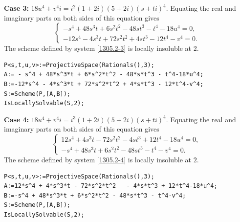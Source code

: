 \documentclass[a4paper,12pt,english,reqno]{amsart}
\begin{document}
{\bf Case 3:} $18u^4+v^4i=i^2(1+2i)(5+2i)(s+ti)^4$. Equating the real and imaginary parts on both sides of this equation gives
\begin{equation}\label{1305.2-3}
\begin{cases}
-s^4 + 48s^3t + 6s^2t^2 - 48st^3 - t^4 - 18u^4=0,\\
-12s^4 - 4s^3t + 72s^2t^2 + 4st^3 - 12t^4 - v^4=0.
\end{cases}
\end{equation}
The scheme defined by system \eqref{1305.2-3} is locally insoluble at $2$.

\begin{lstlisting}
P<s,t,u,v>:=ProjectiveSpace(Rationals(),3);
A:= - s^4 + 48*s^3*t + 6*s^2*t^2 - 48*s*t^3 - t^4-18*u^4;
B:=-12*s^4 - 4*s^3*t + 72*s^2*t^2 + 4*s*t^3 - 12*t^4-v^4;
S:=Scheme(P,[A,B]);
IsLocallySolvable(S,2);
\end{lstlisting}

{\bf Case 4:} $18u^4+v^4i=i^3(1+2i)(5+2i)(s+ti)^4$. Equating the real and imaginary parts on both sides of this equation gives
\begin{equation}\label{1305.2-4}
\begin{cases}
12s^4 + 4s^3t - 72s^2t^2 - 4st^3 + 12t^4 - 18u^4=0,\\
-s^4 + 48s^3t + 6s^2t^2 - 48st^3 - t^4 - v^4=0.
\end{cases}
\end{equation}
The scheme defined by system \eqref{1305.2-4} is locally insoluble at $2$.

\begin{lstlisting}
P<s,t,u,v>:=ProjectiveSpace(Rationals(),3);
A:=12*s^4 + 4*s^3*t - 72*s^2*t^2   - 4*s*t^3 + 12*t^4-18*u^4;
B:=-s^4 + 48*s^3*t + 6*s^2*t^2 - 48*s*t^3 - t^4-v^4;
S:=Scheme(P,[A,B]);
IsLocallySolvable(S,2);
\end{lstlisting}
\end{document}
